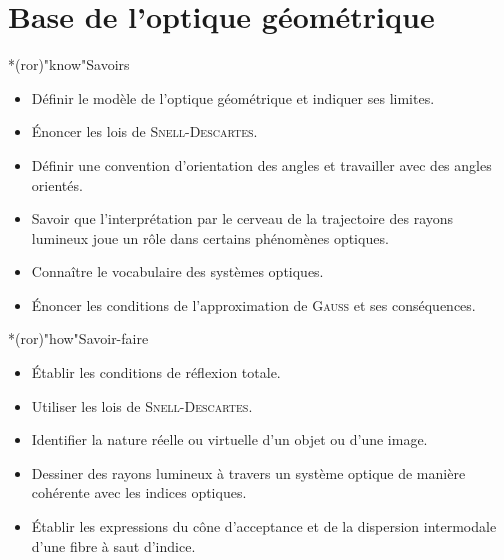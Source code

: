 \documentclass[../../main/main.tex]{subfiles}
\begin{document}
\setcounter{chapter}{1}

\chapter{Base de l'optique g\'eom\'etrique}

\vfill

\begin{prgm}
	\begin{tcb}*(ror)"know"{Savoirs}
		\begin{itemize}[label=$\diamond$, leftmargin=10pt]
			\item Définir le modèle de l'optique géométrique et indiquer ses limites.
			\item Énoncer les lois de \textsc{Snell-Descartes}.
			\item Définir une convention d'orientation des angles et travailler avec
			      des angles orientés.
			\item Savoir que l'interprétation par le cerveau de la trajectoire des
			      rayons lumineux joue un rôle dans certains phénomènes optiques.
			\item Connaître le vocabulaire des systèmes optiques.
			\item Énoncer les conditions de l'approximation de \textsc{Gauss} et ses
			      conséquences.
		\end{itemize}
	\end{tcb}

	\begin{tcb}*(ror)"how"{Savoir-faire}
		\begin{itemize}[label=$\diamond$, leftmargin=10pt]
			\item Établir les conditions de réflexion totale.
			\item Utiliser les lois de \textsc{Snell-Descartes}.
			\item Identifier la nature réelle ou virtuelle d'un objet ou d'une image.
			\item Dessiner des rayons lumineux à travers un système optique de manière
			      cohérente avec les indices optiques.
			\item Établir les expressions du cône d'acceptance et de la dispersion
			      intermodale d'une fibre à saut d'indice.
		\end{itemize}
	\end{tcb}
\end{prgm}

\vfill

\vspace*{\fill}
\minitoc
\vspace*{\fill}
\end{document}
